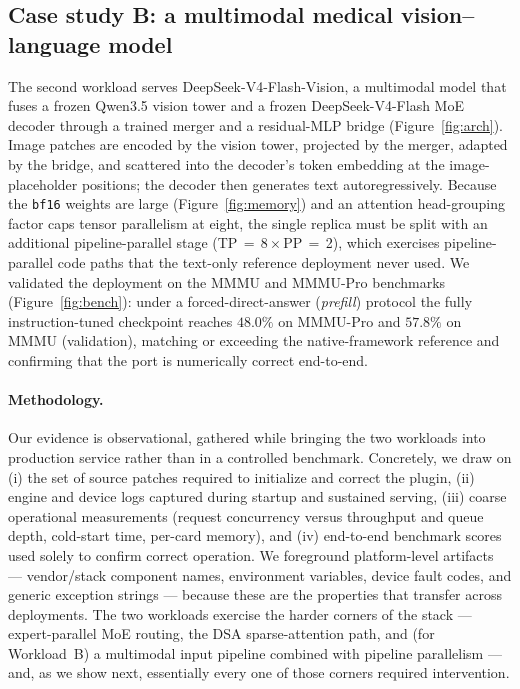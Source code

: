 \documentclass{article}
\newcommand{\code}[1]{\texttt{#1}}
\begin{document}
\subsection{Case study B: a multimodal medical vision--language model}
\label{sec:workloadB}
The second workload serves DeepSeek-V4-Flash-Vision, a multimodal model that
fuses a frozen Qwen3.5 vision tower and a frozen DeepSeek-V4-Flash MoE decoder
through a trained merger and a residual-MLP bridge
(Figure~\ref{fig:arch}). Image patches are encoded by the vision tower, projected
by the merger, adapted by the bridge, and scattered into the decoder's token
embedding at the image-placeholder positions; the decoder then generates text
autoregressively. Because the \code{bf16} weights are large
(Figure~\ref{fig:memory}) and an attention head-grouping factor caps tensor
parallelism at eight, the single replica must be split with an additional
pipeline-parallel stage (TP\,$=$\,8\,$\times$\,PP\,$=$\,2), which exercises
pipeline-parallel code paths that the text-only reference deployment never used.
We validated the deployment on the MMMU and MMMU-Pro benchmarks
(Figure~\ref{fig:bench}): under a forced-direct-answer (\emph{prefill}) protocol
the fully instruction-tuned checkpoint reaches $48.0\%$ on MMMU-Pro and $57.8\%$
on MMMU (validation), matching or exceeding the native-framework reference and
confirming that the port is numerically correct end-to-end.

\paragraph{Methodology.} Our evidence is observational, gathered while bringing
the two workloads into production service rather than in a controlled benchmark.
Concretely, we draw on (i) the set of source patches required to initialize and
correct the plugin, (ii) engine and device logs captured during startup and
sustained serving, (iii) coarse operational measurements (request concurrency
versus throughput and queue depth, cold-start time, per-card memory), and
(iv) end-to-end benchmark scores used solely to confirm correct operation. We
foreground platform-level artifacts --- vendor/stack component names, environment
variables, device fault codes, and generic exception strings --- because these
are the properties that transfer across deployments. The two workloads exercise
the harder corners of the stack --- expert-parallel MoE routing, the DSA
sparse-attention path, and (for Workload~B) a multimodal input pipeline combined
with pipeline parallelism --- and, as we show next, essentially every one of
those corners required intervention.
\end{document}
